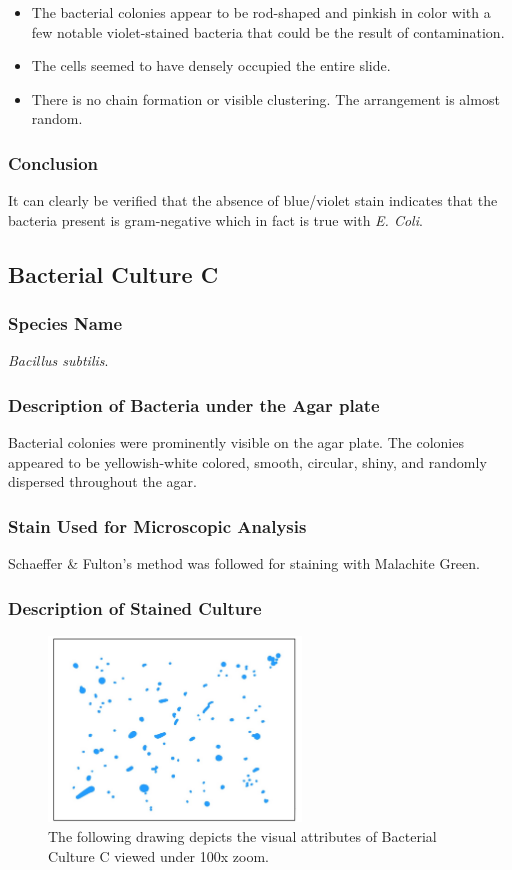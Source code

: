 \documentclass[pdflatex,sn-mathphys]{sn-jnl}%
\theoremstyle{thmstyleone}%
\theoremstyle{thmstyletwo}%
\theoremstyle{thmstylethree}%
\begin{document}
\begin{itemize}
  \item The bacterial colonies appear to be rod-shaped and pinkish in color with a few
        notable violet-stained bacteria that could be the result of contamination.
  \item The cells seemed to have densely occupied the entire slide.
  \item There is no chain formation or visible clustering. The arrangement is almost
        random.
\end{itemize}

\subsubsection{Conclusion}
It can clearly be verified that the absence of blue/violet stain indicates that
the bacteria present is gram-negative which in fact is true with \textit{E.
  Coli}.

\subsection{Bacterial Culture C}\label{subsec:culture_c}
\subsubsection{Species Name}
\textit{Bacillus subtilis}.
\subsubsection{Description of Bacteria under the Agar plate}
Bacterial colonies were prominently visible on the agar plate. The colonies
appeared to be yellowish-white colored, smooth, circular, shiny, and randomly
dispersed throughout the agar.
\subsubsection{Stain Used for Microscopic Analysis}
Schaeffer \& Fulton's method was followed for staining with Malachite Green.

\subsubsection{Description of Stained Culture}
\begin{figure}[h]%
  \centering
  \includegraphics[width=0.6\textwidth]{photos/C.jpg}
  \caption{The following drawing depicts the visual attributes of Bacterial Culture C viewed under 100x zoom. }\label{fig:culture_c}
\end{figure}
\end{document}
